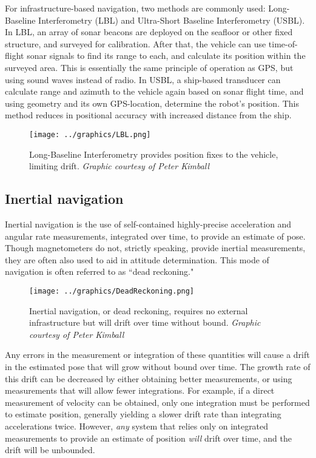 For infrastructure-based navigation, two methods are commonly used: Long-Baseline Interferometry (LBL) and Ultra-Short Baseline Interferometry (USBL). In LBL, an array of sonar beacons are deployed on the seafloor or other fixed structure, and surveyed for calibration. After that, the vehicle can use time-of-flight sonar signals to find its range to each, and calculate its position within the surveyed area. This is essentially the same principle of operation as GPS, but using sound waves instead of radio. In USBL, a ship-based transducer can calculate range and azimuth to the vehicle again based on sonar flight time, and using geometry and its own GPS-location, determine the robot's position. This method reduces in positional accuracy with increased distance from the ship. 

\begin{figure}[htbp]
   \centering
   \texttt{[image: ../graphics/LBL.png]} %
   \caption{Long-Baseline Interferometry provides position fixes to the vehicle, limiting drift. \emph{Graphic courtesy of Peter Kimball}}
   \label{fig:LBL}
\end{figure}

\subsection{Inertial navigation}

Inertial navigation is the use of self-contained highly-precise acceleration and angular rate measurements, integrated over time, to provide an estimate of pose. Though magnetometers do not, strictly speaking, provide inertial measurements, they are often also used to aid in attitude determination. This mode of navigation is often referred to as ``dead reckoning."

\begin{figure}[htbp]
   \centering
   \texttt{[image: ../graphics/DeadReckoning.png]} %
   \caption{Inertial navigation, or dead reckoning, requires no external infrastructure but will drift over time without bound. \emph{Graphic courtesy of Peter Kimball}}
   \label{fig:inertialNav}
\end{figure}

Any errors in the measurement or integration of these quantities will cause a drift in the estimated pose that will grow without bound over time. The growth rate of this drift can be decreased by either obtaining better measurements, or using measurements that will allow fewer integrations. For example, if a direct measurement of velocity can be obtained, only one integration must be performed to estimate position, generally yielding a slower drift rate than integrating accelerations twice. However, \emph{any} system that relies only on integrated measurements to provide an estimate of position \emph{will} drift over time, and the drift will be unbounded. 

